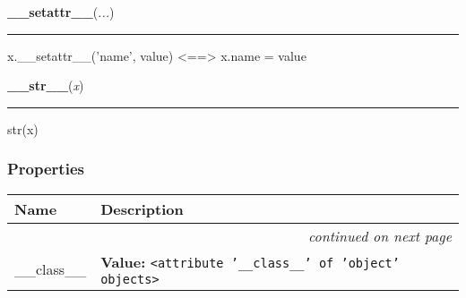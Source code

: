     \vspace{0.5ex}

    \begin{boxedminipage}{\textwidth}

    \raggedright \textbf{\_\_setattr\_\_}(\textit{...})

    \vspace{-1.5ex}

    \rule{\textwidth}{0.5\fboxrule}

x.{\_}{\_}setattr{\_}{\_}('name', value) {\textless}=={\textgreater} x.name = value
    \vspace{1ex}

    \end{boxedminipage}

    \label{object:__str__}

    \vspace{0.5ex}

    \begin{boxedminipage}{\textwidth}

    \raggedright \textbf{\_\_str\_\_}(\textit{x})

    \vspace{-1.5ex}

    \rule{\textwidth}{0.5\fboxrule}

str(x)
    \vspace{1ex}

    \end{boxedminipage}



  \subsubsection{Properties}

\begin{longtable}{|p{}|p{}|l}
\cline{1-2}
\cline{1-2} \centering \textbf{Name} & \centering \textbf{Description}& \\
\cline{1-2}
\endhead\cline{1-2}\multicolumn{3}{r}{\small\textit{continued on next page}}\\\endfoot\cline{1-2}
\endlastfoot\raggedright \_\-\_\-c\-l\-a\-s\-s\-\_\-\_\- & \raggedright \textbf{Value:} 
{\tt {\textless}attribute '\_\_class\_\_' of 'object' objects{\textgreater}}&\\
\cline{1-2}
\end{longtable}

